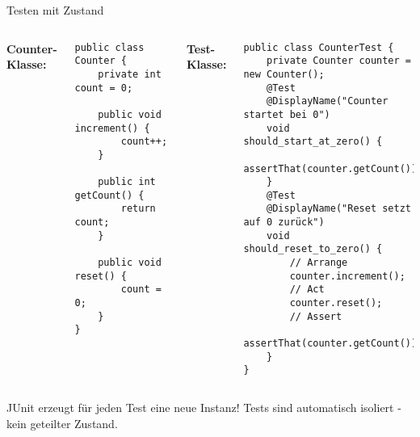 \begin{frame}[fragile]{Testen mit Zustand}
  \begin{columns}[T]
    \textbf{Counter-Klasse:}
    \begin{lstlisting}[style=java, basicstyle=\tiny\ttfamily]
public class Counter {
    private int count = 0;

    public void increment() {
        count++;
    }

    public int getCount() {
        return count;
    }

    public void reset() {
        count = 0;
    }
}
    \end{lstlisting}

    \textbf{Test-Klasse:}
    \begin{lstlisting}[style=java, basicstyle=\tiny\ttfamily]
public class CounterTest {
    private Counter counter = new Counter();
    @Test
    @DisplayName("Counter startet bei 0")
    void should_start_at_zero() {
        assertThat(counter.getCount()).isEqualTo(0);
    }
    @Test
    @DisplayName("Reset setzt auf 0 zurück")
    void should_reset_to_zero() {
        // Arrange
        counter.increment();
        // Act
        counter.reset();
        // Assert
        assertThat(counter.getCount()).isEqualTo(0);
    }
}
    \end{lstlisting}
  \end{columns}

  \begin{alertblock}{JUnit erzeugt für jeden Test eine neue Instanz!}
    Tests sind automatisch isoliert - kein geteilter Zustand.
  \end{alertblock}
\end{frame}

